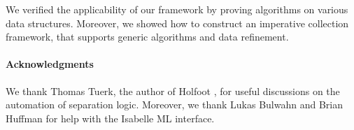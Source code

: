 \documentclass[11pt,a4paper]{article}
\begin{document}
We verified the applicability of our framework by proving algorithms on various
data structures. Moreover, we showed how to construct an imperative collection
framework, that supports generic algorithms and data refinement.

\paragraph{Acknowledgments} We thank Thomas Tuerk, the author of Holfoot 
\cite{Tuerk2011}, for useful discussions on the automation of separation logic.
Moreover, we thank Lukas Bulwahn and Brian Huffman for help with the Isabelle 
ML interface.

\clearpage


\end{document}
